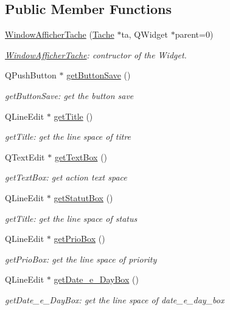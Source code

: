 \subsection*{Public Member Functions}
\begin{DoxyCompactItemize}
\item 
\hyperlink{class_window_afficher_tache_a05d3a934243ff05e1120f07c84efd1fc}{Window\+Afficher\+Tache} (\hyperlink{class_tache}{Tache} $\ast$ta, Q\+Widget $\ast$parent=0)
\begin{DoxyCompactList}\small\item\em \hyperlink{class_window_afficher_tache}{Window\+Afficher\+Tache}\+: contructor of the Widget. \end{DoxyCompactList}\item 
Q\+Push\+Button $\ast$ \hyperlink{class_window_afficher_tache_a8a5df0c8f8b2ace2c5f09daa1cbaa7eb}{get\+Button\+Save} ()
\begin{DoxyCompactList}\small\item\em get\+Button\+Save\+: get the button save \end{DoxyCompactList}\item 
Q\+Line\+Edit $\ast$ \hyperlink{class_window_afficher_tache_a65f59931ef68115aad28770e998eabd5}{get\+Title} ()
\begin{DoxyCompactList}\small\item\em get\+Title\+: get the line space of titre \end{DoxyCompactList}\item 
Q\+Text\+Edit $\ast$ \hyperlink{class_window_afficher_tache_a5fe2e2ee086218f44e4223ce5eeae84c}{get\+Text\+Box} ()
\begin{DoxyCompactList}\small\item\em get\+Text\+Box\+: get action text space \end{DoxyCompactList}\item 
Q\+Line\+Edit $\ast$ \hyperlink{class_window_afficher_tache_ae47fad44c28bba49406b648cb452038d}{get\+Statut\+Box} ()
\begin{DoxyCompactList}\small\item\em get\+Title\+: get the line space of status \end{DoxyCompactList}\item 
Q\+Line\+Edit $\ast$ \hyperlink{class_window_afficher_tache_a2a51fbf9e0089f92bc0b96d2ac7f38a6}{get\+Prio\+Box} ()
\begin{DoxyCompactList}\small\item\em get\+Prio\+Box\+: get the line space of priority \end{DoxyCompactList}\item 
Q\+Line\+Edit $\ast$ \hyperlink{class_window_afficher_tache_ac1bfa30c803531cf3119de9dcf2169ee}{get\+Date\+\_\+e\+\_\+\+Day\+Box} ()
\begin{DoxyCompactList}\small\item\em get\+Date\+\_\+e\+\_\+\+Day\+Box\+: get the line space of date\+\_\+e\+\_\+day\+\_\+box \end{DoxyCompactList}\end{DoxyCompactItemize}



